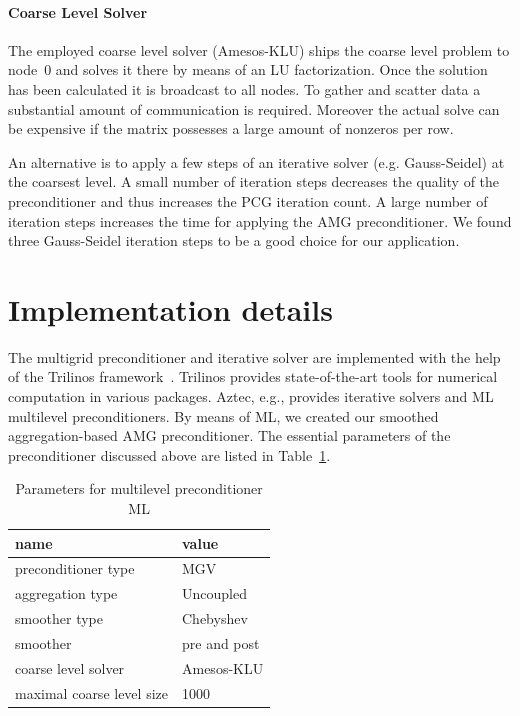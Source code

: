 \documentclass[a4paper,10pt,3p,preprint,pdftex]{elsarticle}
\begin{document}
\paragraph{Coarse Level Solver} The employed coarse level solver
(Amesos-KLU) ships the coarse level problem to node~0 and solves it
there by means of an LU factorization.  Once the solution has been
calculated it is broadcast to all nodes.  To gather and scatter data a
substantial amount of communication is required.  Moreover the actual
solve can be expensive if the matrix possesses a large amount of
nonzeros per row.

An alternative is to apply a few steps of an iterative solver (e.g.
Gauss-Seidel) at the coarsest level.  A small number of iteration steps
decreases the quality of the preconditioner and thus increases the PCG
iteration count.  A large number of iteration steps increases the time
for applying the AMG preconditioner.  We found three Gauss-Seidel
iteration steps to be a good choice for our application.



%
\section{Implementation details}
\label{sec:impl}

The multigrid preconditioner and iterative solver are implemented with
the help of the Trilinos framework~\cite{Trilinos-Web-Site,
  Trilinos-TOMS}.  Trilinos provides state-of-the-art tools for
numerical computation in various packages.  Aztec, e.g., provides
iterative solvers and ML~\cite{gsht:06} multilevel preconditioners.  By
means of ML, we created our smoothed aggregation-based AMG
preconditioner.  The essential parameters of the preconditioner
discussed above are listed in Table~\ref{tab:sa_setup}.
\begin{table}[htb]
  \begin{center}
    \begin{tabular}{l|l}
      \hline
      name & value \\
      \hline
      preconditioner type & MGV \\
      aggregation type & Uncoupled \\
      smoother type & Chebyshev \\
      smoother & pre and post \\
      coarse level solver & Amesos-KLU \\
      maximal coarse level size & 1000 \\
      \hline
    \end{tabular}
    \caption{Parameters for multilevel
      preconditioner ML}
    \label{tab:sa_setup}
  \end{center}
\end{table}
\end{document}
